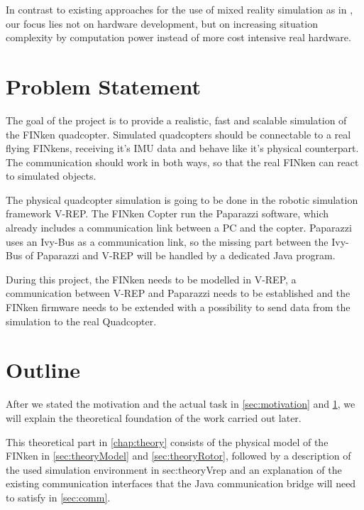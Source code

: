 In contrast to existing approaches for the use of mixed reality simulation as in \cite{Chen2011}, our focus lies not on hardware development, but on increasing situation complexity by computation power instead of more cost intensive real hardware.




       


  
\section{Problem Statement}
\label{sec:problem}
    The goal of the project is to provide a realistic, fast and scalable simulation of the FINken quadcopter.  
    Simulated quadcopters should be connectable to a real flying FINkens, receiving it's    
    \gls{IMU} data and behave like it's physical counterpart. 
    The communication should work in both ways, so that the real FINken can react to simulated objects.

The physical quadcopter simulation is going to be done in the robotic simulation framework V-REP\cite{vrep}. 
The FINken Copter run the Paparazzi\cite{pprz} software, which already includes a communication link between a PC and the copter. 
Paparazzi uses an Ivy-Bus as a communication link, so the missing part between the Ivy-Bus of Paparazzi and V-REP will be handled by a dedicated Java program.

During this project, the FINken needs to be modelled in V-REP, a communication between V-REP and Paparazzi needs to be established and the FINken firmware needs to be extended with a possibility to send data from the simulation to the real Quadcopter.
 
         
\section{Outline}
    After we stated the motivation and the actual task in \ref{sec:motivation} and \ref{sec:problem}, we will explain the theoretical foundation of the work carried out later.
    
    This theoretical part in \ref{chap:theory} consists of the physical model of the FINken in \ref{sec:theoryModel} and \ref{sec:theoryRotor}, followed by a description of the used simulation environment in {sec:theoryVrep} and an explanation of the existing communication interfaces that the Java communication bridge will need to satisfy in \ref{sec:comm}.
    

